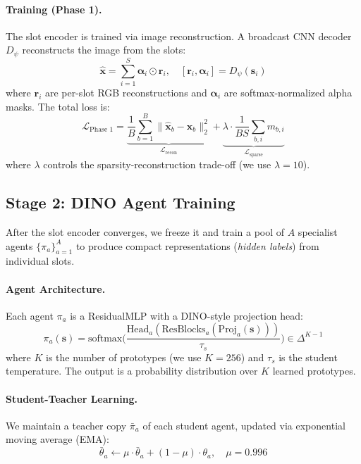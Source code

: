 \documentclass{article}
\newcommand{\calL}{\mathcal{L}}
\begin{document}
\paragraph{Training (Phase 1).}
The slot encoder is trained via image reconstruction. A broadcast CNN decoder $D_\psi$ reconstructs the image from the slots:
\begin{equation}
    \hat{\mathbf{x}} = \sum_{i=1}^{S} \boldsymbol{\alpha}_i \odot \mathbf{r}_i, \quad [\mathbf{r}_i, \boldsymbol{\alpha}_i] = D_\psi(\mathbf{s}_i)
\end{equation}
where $\mathbf{r}_i$ are per-slot RGB reconstructions and $\boldsymbol{\alpha}_i$ are softmax-normalized alpha masks.
The total loss is:
\begin{equation}
    \calL_{\text{Phase 1}} = \underbrace{\frac{1}{B}\sum_{b=1}^{B}\|\hat{\mathbf{x}}_b - \mathbf{x}_b\|_2^2}_{\calL_\text{recon}} + \underbrace{\lambda \cdot \frac{1}{BS}\sum_{b,i} m_{b,i}}_{\calL_\text{sparse}}
    \label{eq:phase1}
\end{equation}
where $\lambda$ controls the sparsity-reconstruction trade-off (we use $\lambda=10$).


\subsection{Stage 2: DINO Agent Training}
\label{sec:agents}

After the slot encoder converges, we freeze it and train a pool of $A$ specialist agents $\{\pi_a\}_{a=1}^A$ to produce compact representations (\textit{hidden labels}) from individual slots.

\paragraph{Agent Architecture.}
Each agent $\pi_a$ is a ResidualMLP with a DINO-style projection head:
\begin{equation}
    \pi_a(\mathbf{s}) = \text{softmax}\!\Big(\frac{\text{Head}_a(\text{ResBlocks}_a(\text{Proj}_a(\mathbf{s})))}{\tau_s}\Big) \in \Delta^{K-1}
\end{equation}
where $K$ is the number of prototypes (we use $K=256$) and $\tau_s$ is the student temperature. The output is a probability distribution over $K$ learned prototypes.

\paragraph{Student-Teacher Learning.}
We maintain a teacher copy $\bar{\pi}_a$ of each student agent, updated via exponential moving average (EMA):
\begin{equation}
    \bar{\theta}_a \leftarrow \mu \cdot \bar{\theta}_a + (1-\mu) \cdot \theta_a, \quad \mu = 0.996
\end{equation}
\end{document}
